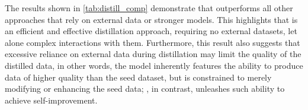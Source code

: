 \begin{table}[t]
  \centering
  \caption{Comparison of distillation approaches (\%).}
  \label{tab:distill_comp}
    \setlength{\tabcolsep}{2pt}
\end{table}

The results shown in \cref{tab:distill_comp} demonstrate that {\langname} outperforms all other approaches that rely on external data or stronger models. This highlights that {\langname} is an efficient and effective distillation approach, requiring no external datasets, let alone complex interactions with them. Furthermore, this result also suggests that excessive reliance on external data during distillation may limit the quality of the distilled data, in other words, the model inherently features the ability to produce data of higher quality than the seed dataset, but is constrained to merely modifying or enhancing the seed data; {\langname}, in contrast, unleashes such ability to achieve self-improvement.




